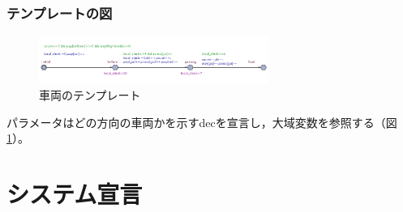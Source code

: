 \documentclass[twocolumn,a4paper]{jsarticle}
\begin{document}
\subsubsection{テンプレートの図}
\begin{figure}
  \centering
  \includegraphics[width=75mm]{temp.png}
  \caption{車両のテンプレート}
  \label{temp}
\end{figure}
パラメータはどの方向の車両かを示すdecを宣言し，大域変数を参照する（図\ref{temp}）。
\section{システム宣言}
\end{document}
